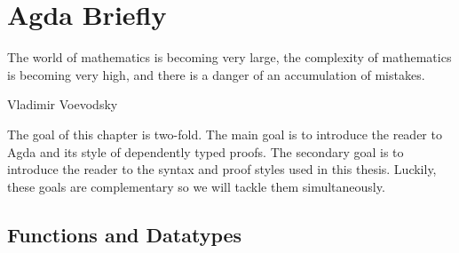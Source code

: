 \documentclass[./Thesis.tex]{subfiles}
\begin{document}
\chapter{Agda Briefly}
\label{chap:agda-briefly}

\epigraph{
  The world of mathematics is becoming very large, the complexity of
  mathematics is becoming very high, and there is a danger of an
  accumulation of mistakes.
}{Vladimir Voevodsky \cite{voevodsky-quote}}

The goal of this chapter is two-fold. The main goal is to introduce the reader
to Agda and its style of dependently typed proofs. The secondary goal is to
introduce the reader to the syntax and proof styles used in this thesis. Luckily,
these goals are complementary so we will tackle them simultaneously.

\section{Functions and Datatypes}
\label{sec:functions-and-datatypes}
\end{document}
